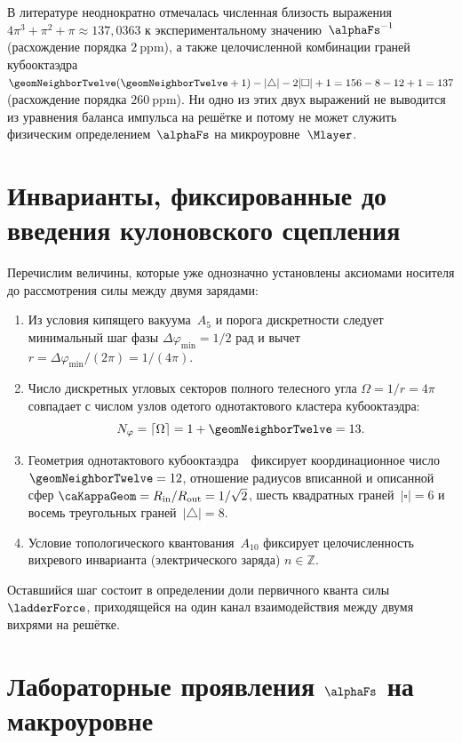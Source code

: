 \begin{remark}
\label{rem:pi-tower}
В литературе неоднократно отмечалась численная близость выражения $4\pi^3 + \pi^2 + \pi \approx 137{,}0363$ к экспериментальному значению~$\alphaFs^{-1}$ (расхождение порядка $2\ \mathrm{ppm}$), а также целочисленной комбинации граней кубооктаэдра $\geomNeighborTwelve(\geomNeighborTwelve+1) - |\triangle| - 2|\square| + 1 = 156 - 8 - 12 + 1 = 137$ (расхождение порядка $260\ \mathrm{ppm}$).
Ни одно из этих двух выражений не выводится из уравнения баланса импульса на решётке и потому не может служить физическим определением~$\alphaFs$ на микроуровне~$\Mlayer$.
\end{remark}

\section{Инварианты, фиксированные до введения кулоновского сцепления}

Перечислим величины, которые уже однозначно установлены аксиомами носителя до рассмотрения силы между двумя зарядами:
\begin{enumerate}[label=\arabic*.]
\item Из условия кипящего вакуума~$A_5$ и порога дискретности следует минимальный шаг фазы $\Delta\varphi_{\min} = 1/2$ рад и вычет $r = \Delta\varphi_{\min}/(2\pi) = 1/(4\pi)$.
\item Число дискретных угловых секторов полного телесного угла $\Omega = 1/r = 4\pi$ совпадает с числом узлов одетого однотактового кластера кубооктаэдра:
  \[
    N_\varphi = \lceil\Omega\rceil = 1 + \geomNeighborTwelve = 13.
  \]
\item Геометрия однотактового кубооктаэдра~\latGCKshort\ фиксирует координационное число $\geomNeighborTwelve = 12$, отношение радиусов вписанной и описанной сфер $\caKappaGeom = R_{\mathrm{in}}/R_{\mathrm{out}} = 1/\sqrt{2}$, шесть квадратных граней~$|\square|=6$ и восемь треугольных граней~$|\triangle|=8$.
\item Условие топологического квантования~$A_{10}$ фиксирует целочисленность вихревого инварианта (электрического заряда) $n\in\mathbb{Z}$.
\end{enumerate}

Оставшийся шаг состоит в определении доли первичного кванта силы~$\ladderForce$, приходящейся на один канал взаимодействия между двумя вихрями на решётке.

\section{Лабораторные проявления $\alphaFs$ на макроуровне}

